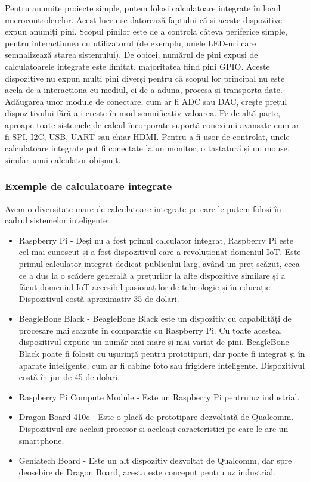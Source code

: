 Pentru anumite proiecte simple, putem folosi calculatoare integrate în locul
microcontrolerelor. Acest lucru se datorează faptului că și aceste dispozitive
expun anumiți pini. Scopul pinilor este de a controla câteva periferice simple,
pentru interacțiunea cu utilizatorul (de exemplu, unele LED-uri
 care semnalizează starea sistemului). De
obicei, numărul de pini expuși de calculatoarele integrate este limitat,
majoritatea fiind pini GPIO. Aceste dispozitive nu expun mulți pini diverși
pentru că scopul lor principal nu este acela de a interacționa cu mediul, ci de
a aduna, procesa și transporta date. Adăugarea unor module de conectare, cum ar
fi ADC sau DAC, crește prețul dispozitivului fără a-i crește în mod semnificativ
valoarea. Pe de altă parte, aproape toate sistemele de calcul încorporate
suportă conexiuni avansate cum ar fi SPI, I2C, USB, UART sau chiar HDMI. Pentru
a fi ușor de controlat, unele calculatoare integrate pot fi conectate la un
monitor, o tastatură și un mouse, similar unui calculator obișnuit.

\subsubsection{Exemple de calculatoare integrate}
\label{sec:embed-ics-embed-ex}

Avem o diversitate mare de calculatoare integrate pe care le putem folosi în
cadrul sistemelor inteligente:

\begin{itemize}
	\item Raspberry Pi - Deși nu a fost primul calculator integrat,
		Raspberry Pi este cel mai cunoscut și a fost dispozitivul care a
		revoluționat domeniul IoT. Este primul calculator integrat
		dedicat publicului larg, având un preț scăzut, ceea ce a dus la
		o scădere generală a prețurilor la alte dispozitive similare și
		a făcut domeniul IoT accesibil pasionaților de tehnologie și în
		educație. Dispozitivul costă aproximativ 35 de dolari.
	\item BeagleBone Black - BeagleBone Black este un dispozitiv cu
		capabilități de procesare mai scăzute în comparație cu Raspberry
		Pi. Cu toate acestea, dispozitivul expune un număr mai mare și
		mai variat de pini. BeagleBone Black poate fi folosit cu
		ușurință pentru prototipuri, dar poate fi integrat și în aparate
		inteligente, cum ar fi cabine foto sau frigidere inteligente.
		Dispozitivul costă în jur de 45 de dolari.
	\item Raspberry Pi Compute Module - Este un Raspberry Pi pentru uz
		industrial.
	\item Dragon Board 410c - Este o placă de prototipare dezvoltată de
		Qualcomm. Dispozitivul are același procesor și aceleași
		caracteristici pe care le are un smartphone.
	\item Geniatech Board - Este un alt dispozitiv dezvoltat de Qualcomm,
		dar spre deosebire de Dragon Board, acesta este conceput pentru
		uz industrial.
\end{itemize}

